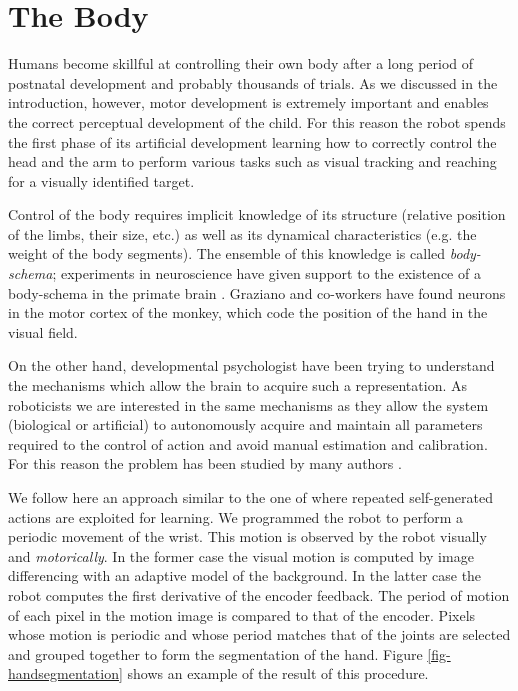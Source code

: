 \section{The Body}
\label{sect:body}

Humans become skillful at controlling their own body after a long period of postnatal development and probably thousands of trials. As we discussed in the introduction, however, motor development is extremely important and enables the correct perceptual development of the child. For this reason the robot spends the first phase of its artificial development learning how to correctly control the head and the arm to perform various tasks such as visual tracking and reaching for a visually identified target.

Control of the body requires implicit knowledge of its structure (relative position of the limbs, their size, etc.) as well as its dynamical characteristics (e.g. the weight of the body segments). The ensemble of this knowledge is called \emph{body-schema}; experiments in neuroscience have given support to the existence of a body-schema in the primate brain \cite{graziano99whereis,graziano00coding}. Graziano and co-workers have found neurons in the motor cortex of the monkey, which code the position of the hand in the visual field.

On the other hand, developmental psychologist have been trying to understand the mechanisms which allow the brain to acquire such a representation. As roboticists we are interested in the same mechanisms as they allow the system (biological or artificial) to autonomously acquire and maintain all parameters required to the control of action and avoid manual estimation and calibration. For this reason the problem has been studied by many authors \cite{yoshikawa03doestheinvariance,fitzpatrick04feelthebeat,metta03early}.

We follow here an approach similar to the one of \cite{fitzpatrick04feelthebeat,metta03early} where repeated self-generated actions are exploited for learning. We programmed the robot to perform a periodic movement of the wrist. This motion is observed by the robot visually and \emph{motorically}. In the former case the visual motion is computed by image differencing with an adaptive model of the background. In the latter case the robot computes the first derivative of the encoder feedback. The period of motion of each pixel in the motion image is compared to that of the encoder. Pixels whose motion is periodic and whose period matches that of the joints are selected and grouped together to form the segmentation of the hand. Figure \ref{fig-handsegmentation} shows an example of the result of this procedure.

